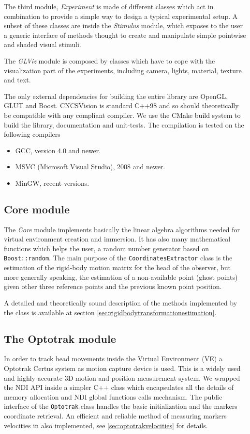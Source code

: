 \documentclass[acmtocl,acmnow]{acmtrans2m}
\begin{document}
The third module, \textit{Experiment} is made of different classes which act in combination to provide 
a simple way to design a typical experimental setup. A subset of these classes
are inside the \textit{Stimulus} module, which exposes to the user a generic 
interface of methods thought to create and manipulate simple pointwise and
shaded visual stimuli.

The \textit{GLViz} module is composed by classes which have to cope with the
visualization part of the experiments, including camera, lights, material,
texture and text.

The only external dependencies for building the entire library are OpenGL, GLUT and Boost. CNCSVision is standard C++98 and so should theoretically be compatible with any compliant compiler. 
We use the CMake build system to build the library, documentation and unit-tests. The compilation is tested on the following compilers
\begin{itemize}
\item GCC, version 4.0 and newer.
\item MSVC (Microsoft Visual Studio), 2008 and newer.
\item MinGW, recent versions.   
\end{itemize}

\subsection{Core module}\label{sec:coremodule}
The \emph{Core} module implements basically the linear algebra algorithms needed for virtual environment creation and immersion.
It has also many mathematical functions which helps the user, a random number generator based on \texttt{Boost::random}.
The main purpose of the \verb=CoordinatesExtractor= class is the estimation of
the rigid-body motion matrix for the head of the observer, but more generally
speaking, the estimation of a non-available point (ghost points)
 given other three reference points and the previous known point position.

A detailed and theoretically sound description of the methods implemented by the class is available at section \ref{sec:rigidbodytransformationestimation}.

\subsection{The Optotrak module}\label{sec:optotrakmodule}
In order to track head movements inside the Virtual Environment (VE) a Optotrak
Certus system as motion capture device is used. This is a widely used and highly
accurate 3D motion and position measurement system.
We wrapped the NDI API inside a simpler C++ class which
encapsulates all the details of memory allocation and NDI global functions calls mechanism.
The public interface of the \texttt{Optotrak} class handles the basic initialization and the markers
coordinate retrieval. An efficient and reliable method of measuring markers velocities in also implemented, see
\ref{sec:optotrakvelocities} for details.
\end{document}
